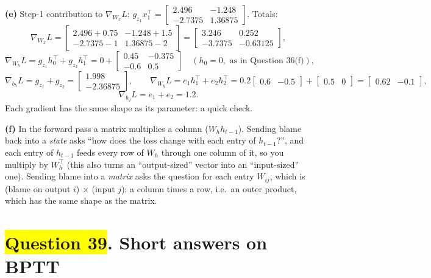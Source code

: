 \documentclass[12pt,a4paper]{article}
\newcommand{\hlq}[1]{{\setlength{\fboxsep}{1.5pt}\colorbox{yellow}{#1}}}
\begin{document}
\textbf{(e)} Step-1 contribution to $\nabla_{W_x}L$: $g_{z_1}x_1^\top=\begin{bmatrix}2.496&-1.248\\-2.7375&1.36875\end{bmatrix}$. Totals:
\[
\nabla_{W_x}L=\begin{bmatrix}2.496+0.75&-1.248+1.5\\-2.7375-1&1.36875-2\end{bmatrix}=\begin{bmatrix}3.246&0.252\\-3.7375&-0.63125\end{bmatrix},
\]
\[
\nabla_{W_h}L=g_{z_1}h_0^\top+g_{z_2}h_1^\top=0+\begin{bmatrix}0.45&-0.375\\-0.6&0.5\end{bmatrix}\quad(h_0=0,\text{ as in Question 36(f)}),
\]
\[
\nabla_{b_h}L=g_{z_1}+g_{z_2}=\begin{bmatrix}1.998\\-2.36875\end{bmatrix},\qquad
\nabla_{W_y}L=e_1h_1^\top+e_2h_2^\top=0.2\begin{bmatrix}0.6&-0.5\end{bmatrix}+\begin{bmatrix}0.5&0\end{bmatrix}=\begin{bmatrix}0.62&-0.1\end{bmatrix},
\]
\[
\nabla_{b_y}L=e_1+e_2=1.2 .
\]
Each gradient has the same shape as its parameter: a quick check.

\textbf{(f)} In the forward pass a matrix multiplies a column ($W_hh_{t-1}$). Sending blame back into a \emph{state} asks ``how does the loss change with each entry of $h_{t-1}$?'', and each entry of $h_{t-1}$ feeds every row of $W_h$ through one column of it, so you multiply by $W_h^\top$ (this also turns an ``output-sized'' vector into an ``input-sized'' one). Sending blame into a \emph{matrix} asks the question for each entry $W_{ij}$, which is (blame on output $i$) $\times$ (input $j$): a column times a row, i.e.\ an outer product, which has the same shape as the matrix.

\section[Question 39. Short answers on BPTT]{\hlq{Question 39}. Short answers on BPTT}
\end{document}
